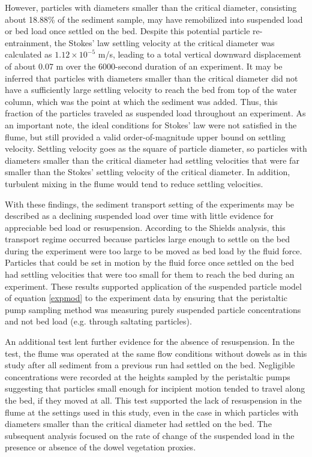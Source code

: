 \documentclass[12pt]{article}
\begin{document}
However, particles with diameters smaller than the critical diameter, consisting about 18.88\% of the sediment sample, may have remobilized into suspended load or bed load once settled on the bed. Despite this potential particle re-entrainment, the Stokes’ law settling velocity at the critical diameter was calculated as $1.12 \times 10^{-5}$ m/s, leading to a total vertical downward displacement of about 0.07 m over the 6000-second duration of an experiment. It may be inferred that particles with diameters smaller than the critical diameter did not have a sufficiently large settling velocity to reach the bed from top of the water column, which was the point at which the sediment was added. Thus, this fraction of the particles traveled as suspended load throughout an experiment. As an important note, the ideal conditions for Stokes’ law were not satisfied in the flume, but still provided a valid order-of-magnitude upper bound on settling velocity. Settling velocity goes as the square of particle diameter, so particles with diameters smaller than the critical diameter had settling velocities that were far smaller than the Stokes’ settling velocity of the critical diameter. In addition, turbulent mixing in the flume would tend to reduce settling velocities.

With these findings, the sediment transport setting of the experiments may be described as a declining suspended load over time with little evidence for appreciable bed load or resuspension. According to the Shields analysis, this transport regime occurred because particles large enough to settle on the bed during the experiment were too large to be moved as bed load by the fluid force. Particles that could be set in motion by the fluid force once settled on the bed had settling velocities that were too small for them to reach the bed during an experiment. These results supported application of the suspended particle model of equation \ref{expmod} to the experiment data by ensuring that the peristaltic pump sampling method was measuring purely suspended particle concentrations and not bed load (e.g. through saltating particles).

An additional test lent further evidence for the absence of resuspension. In the test, the flume was operated at the same flow conditions without dowels as in this study after all sediment from a previous run had settled on the bed. Negligible concentrations were recorded at the heights sampled by the peristaltic pumps suggesting that particles small enough for incipient motion tended to travel along the bed, if they moved at all. This test supported the lack of resuspension in the flume at the settings used in this study, even in the case in which particles with diameters smaller than the critical diameter had settled on the bed. The subsequent analysis focused on the rate of change of the suspended load in the presence or absence of the dowel vegetation proxies.
\end{document}
